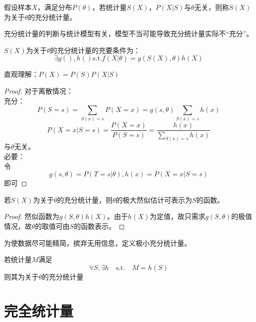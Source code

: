 \begin{definition}[充分统计量]
	假设样本$X$，满足分布$P(\theta)$，若统计量$S(X)$，$P(X|S)$与$\theta$无关，则称$S(X)$为关于$\theta$的充分统计量。
\end{definition}

\begin{remark}
	充分统计量的判断与统计模型有关，模型不当可能导致充分统计量实际不“充分”。
\end{remark}

\begin{theorem}[分解定理]
	$S(X)$为关于$\theta$的充分统计量的充要条件为：
	$$\exists g(),h() \text{s.t.} f(X|\theta)=g(S(X),\theta)h(X)$$
\end{theorem}

\begin{remark}
	直观理解：$P(X)=P(S)P(X|S)$
\end{remark}

\begin{proof}
	对于离散情况：\\
	充分：
	$$P(S=s)=\sum_{S(x)=s}P(X=x)=g(s,\theta)\sum_{S(x)=s}h(x)$$
	$$P(X=x|S=s)=\frac{P(X=x)}{P(S=s)}=\frac{h(x)}{\sum_{S(x)=s}h(x)}$$
	与$\theta$无关。\\
	必要：\\
	令$$g(s,\theta)=P(T=s|\theta),h(x)=P(X=x|S=s)$$即可
\end{proof}

\begin{theorem}
	若$S(X)$为关于$\theta$的充分统计量，则$\theta$的极大然似估计可表示为$S$的函数。
\end{theorem}

\begin{proof}
	然似函数为$g(S,\theta)h(X)$。由于$h(X)$为定值，故只需求$g(S,\theta)$的极值情况，故$\theta$的取值可由$S$的函数表示。
\end{proof}

为使数据尽可能精简，摈弃无用信息，定义极小充分统计量。

\begin{definition}[极小充分统计量]
	若统计量$M$满足
	$$\forall S, \exists h  \quad \text{s.t.} \quad
	 M=h(S) $$
	则其为关于$\theta$的充分统计量
\end{definition}

\section{完全统计量}


